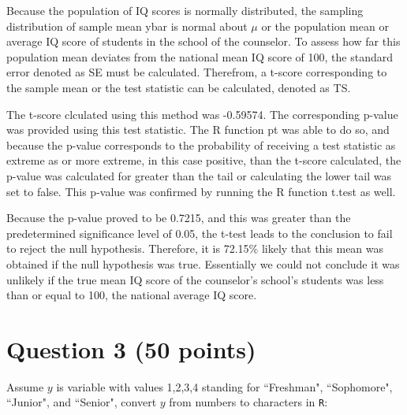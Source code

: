 \documentclass[12pt,letterpaper]{article}
\begin{document}
\vspace{.5cm}

\noindent Because the population of IQ scores is normally distributed, the sampling distribution of sample mean ybar is normal about $\mu $ or the population mean or average IQ score of students in the school of the counselor. To assess how far this population mean deviates from the national mean IQ score of 100, the standard error denoted as SE must be calculated. Therefrom, a t-score corresponding to the sample mean or the test statistic can be calculated, denoted as TS.

\vspace{.5cm}
  
\vspace{.5cm}

\noindent The t-score clculated using this method was -0.59574. The corresponding p-value was provided using this test statistic. The R function pt was able to do so, and because the p-value corresponds to the probability of receiving a test statistic as extreme as or more extreme, in this case positive, than the t-score calculated, the p-value was calculated for greater than the tail or calculating the lower tail was set to false. This p-value was confirmed by running the R function t.test as well.

\vspace{.5cm}
  
\vspace{.5cm}

\noindent Because the p-value proved to be 0.7215, and this was greater than the predetermined significance level of 0.05, the t-test leads to the conclusion to fail to reject the null hypothesis. Therefore, it is 72.15\% likely that this mean was obtained if the null hypothesis was true. Essentially we could not conclude it was unlikely if the true mean IQ score of the counselor's school's students was less than or equal to 100, the national average IQ score.

\vspace{1cm}
	\section*{Question 3 (50 points)}
Assume $y$ is variable with values 1,2,3,4 standing for ``Freshman", ``Sophomore", ``Junior", and ``Senior", convert $y$ from numbers to characters in \texttt{R}:
\vspace{.5cm}
  
\vspace{.5cm}
\end{document}
